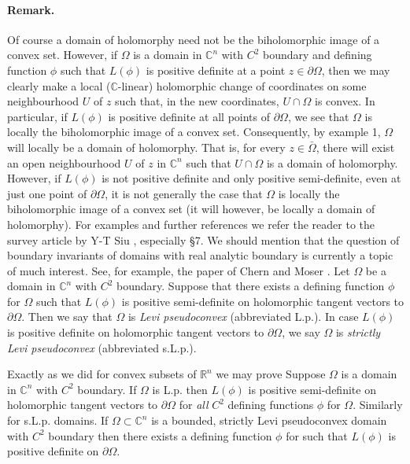 \paragraph*{Remark.} Of course a domain of holomorphy need not be the biholomorphic image of a convex set. However, if $\Omega$ is a domain in $\mathbb C^n$ with $C^2$ boundary and defining function $\phi$ such that $L(\phi)$ is positive definite at a point $z\in\partial\Omega$, then we may clearly make a local ($\mathbb C$-linear) holomorphic change of coordinates on some neighbourhood $U$ of $z$ such that, in the new coordinates, $U\cap\Omega$ is convex. In particular, if $L(\phi)$ is positive definite at all points of $\partial\Omega$, we see that $\Omega$ is locally the biholomorphic image of a convex set. Consequently, by example 1, $\Omega$ will locally be a domain of holomorphy. That is, for every $z\in\bar\Omega$, there will exist an open neighbourhood $U$ of $z$ in $\mathbb C^n$ such that $U\cap\Omega$ is a domain of holomorphy. However, if $L(\phi)$ is not positive definite and only positive semi-definite, even at just one point of $\partial\Omega$, it is not generally the case that $\Omega$ is locally the biholomorphic image of a convex set (it will however, be locally a domain of holomorphy). For examples and further references we refer the reader to the survey article by Y-T Siu \cite{bib:I:siu-y-t:1}, especially \S7. We should mention that the question of boundary invariants of domains with real analytic boundary is currently a topic of much interest. See, for example, the paper of Chern and Moser \cite{bib:I:chern-s-s-and-moser-j:1}.
 Let $\Omega$ be a domain in $\mathbb C^n$ with $C^2$ boundary. Suppose that there exists a defining function $\phi$ for $\Omega$ such that $L(\phi)$ is positive semi-definite on holomorphic tangent vectors to $\partial\Omega$. Then we say that $\Omega$ is \emph{Levi pseudoconvex} (abbreviated L.p.). In case $L(\phi)$ is positive definite on holomorphic tangent vectors to $\partial\Omega$, we say $\Omega$ is \emph{strictly Levi pseudoconvex} (abbreviated s.L.p.).

Exactly as we did for convex subsets of $\mathbb R^n$ we may prove
 Suppose $\Omega$ is a domain in $\mathbb C^n$ with $C^2$ boundary. If $\Omega$ is L.p. then $L(\phi)$ is positive semi-definite on holomorphic tangent vectors to $\partial\Omega$ for \emph{all} $C^2$ defining functions $\phi$ for $\Omega$. Similarly for s.L.p. domains.
 If $\Omega\subset\mathbb C^n$ is a bounded, strictly Levi pseudoconvex domain with $C^2$ boundary then there exists a defining function $\phi$ for such that $L(\phi)$ is positive definite on $\partial\Omega$.

